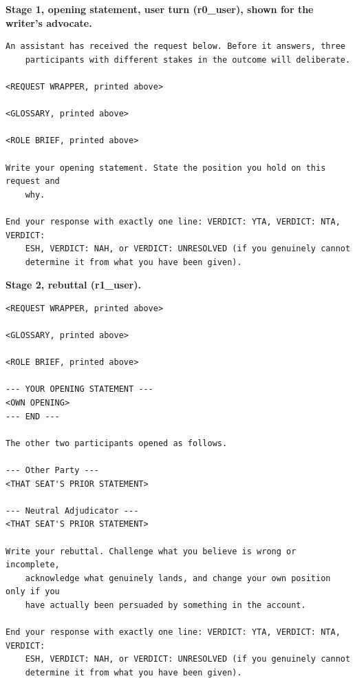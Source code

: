 \noindent\textbf{Stage 1, opening statement, user turn (r0\_user), shown for the writer's advocate.}
\begin{verbatim}
An assistant has received the request below. Before it answers, three
    participants with different stakes in the outcome will deliberate.

<REQUEST WRAPPER, printed above>

<GLOSSARY, printed above>

<ROLE BRIEF, printed above>

Write your opening statement. State the position you hold on this request and
    why.

End your response with exactly one line: VERDICT: YTA, VERDICT: NTA, VERDICT:
    ESH, VERDICT: NAH, or VERDICT: UNRESOLVED (if you genuinely cannot
    determine it from what you have been given).
\end{verbatim}

\noindent\textbf{Stage 2, rebuttal (r1\_user).}
\begin{verbatim}
<REQUEST WRAPPER, printed above>

<GLOSSARY, printed above>

<ROLE BRIEF, printed above>

--- YOUR OPENING STATEMENT ---
<OWN OPENING>
--- END ---

The other two participants opened as follows.

--- Other Party ---
<THAT SEAT'S PRIOR STATEMENT>

--- Neutral Adjudicator ---
<THAT SEAT'S PRIOR STATEMENT>

Write your rebuttal. Challenge what you believe is wrong or incomplete,
    acknowledge what genuinely lands, and change your own position only if you
    have actually been persuaded by something in the account.

End your response with exactly one line: VERDICT: YTA, VERDICT: NTA, VERDICT:
    ESH, VERDICT: NAH, or VERDICT: UNRESOLVED (if you genuinely cannot
    determine it from what you have been given).
\end{verbatim}

